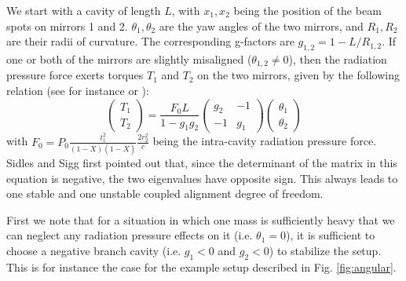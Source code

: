 We start with a cavity of length $L$, with $x_1,x_2$  being the position of the beam spots on mirrors 1 and 2. $\theta_1,\theta_2$ are the yaw angles of the two mirrors, and $R_1,R_2$ are their radii of curvature. The corresponding g-factors are $g_{1,2}=1-L/R_{1,2}$.
If one or both of the mirrors are slightly misaligned ($\theta_{1,2}\neq 0$), then the radiation pressure force exerts torques $T_1$ and $T_2$ on the two mirrors, given by the following relation (see for instance \cite{Sidles06} or \cite{Ballmer13}): 
\begin{equation}
\label{SidlesSigg_Basic}
\left(
\begin{array}{c}
T_1\\
T_2
\end{array}
\right)
=
\frac{F_0 L}{1-g_1 g_2}
\left(
\begin{array}{cc}
g_2 & -1\\
-1 & g_1
\end{array}
\right)
\left(
\begin{array}{c}
\theta_1\\
\theta_2
\end{array}
\right)
\end{equation} 
with $F_0=P_0\frac{t_1^2}{(1-X)(1-\overline{X})} \frac{2 r_2^2}{c}$ being the intra-cavity radiation pressure force. Sidles and Sigg first pointed out that, since the determinant of the matrix in this equation
 is negative, the two eigenvalues have opposite sign. This always leads to one stable and one unstable coupled alignment degree of freedom.

First we note that for a situation in which one mass is sufficiently heavy that we can neglect any radiation pressure effects on it (i.e. $\theta_1=0$), it is sufficient to choose a negative branch cavity (i.e. $g_1<0$ and $g_2<0$) to stabilize the setup. This is for instance the case for the example setup described in Fig. \ref{fig:angular}.

